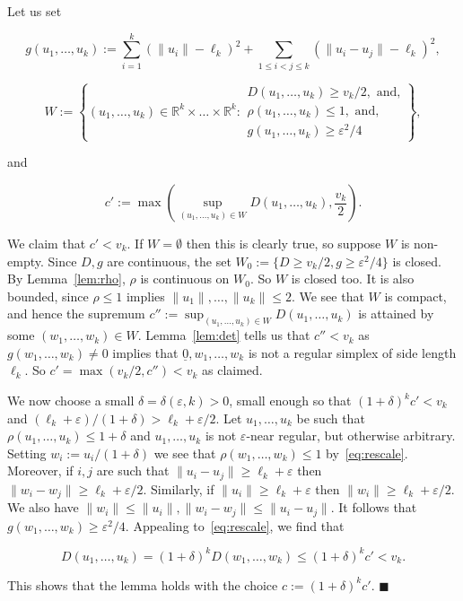 \documentclass[11pt]{article}%
\newenvironment{proof}{\vspace{1ex}\noindent{\bf Proof.}}{\hspace*{\fill}$\blacksquare$\vspace{1ex}}
\newcommand{\eR}[0]{\ensuremath{ \mathbb R}}
\newcommand{\norm}[1]{\ensuremath{\|#1\|}}
\newcommand{\eps}{\varepsilon}
\newcommand{\orig}{\underline{0}}
\begin{document}
\begin{proof}
Let us set

$$ \displaystyle g(u_1,\dots,u_k) := \sum_{i=1}^k \left( \norm{u_i}-\ell_k\right)^2 + \sum_{1\leq i<j \leq k}
 \left( \norm{u_i-u_j}-\ell_k\right)^2, $$
 
$$ W := \left\{ (u_1,\dots,u_k) \in \eR^k\times\dots\times\eR^k : 
\begin{array}{l} D(u_1,\dots,u_k) \geq v_k/2, \text{ and,} \\
\rho(u_1,\dots,u_k) \leq 1, \text{ and,} \\
g(u_1,\dots,u_k) \geq \eps^2/4
\end{array} \right\}, $$


\noindent 
and 

$$ c' := \max\left( \sup_{(u_1,\dots,u_k) \in W} D(u_1,\dots,u_k), \frac{v_k}{2} \right). $$

\noindent
We claim that $c' < v_k$. If $W = \emptyset$ then this is clearly true, so suppose $W$ is non-empty.
Since $D, g$ are continuous, the set $W_0 := \{ D \geq v_k/2, g \geq \eps^2/4 \}$ is closed.
By Lemma~\ref{lem:rho}, $\rho$ is continuous on $W_0$. So $W$ is closed too.
It is also bounded, since $\rho\leq 1$ implies $\norm{u_1},\dots,\norm{u_k} \leq 2$.
We see that $W$ is compact, and hence the supremum $c'' := \sup_{(u_1,\dots,u_k) \in W} D(u_1,\dots,u_k)$ is 
attained by some $(w_1,\dots,w_k) \in W$. Lemma~\ref{lem:det} tells us that 
$c'' < v_k$ as $g(w_1,\dots,w_k) \neq 0$ implies that $\orig,w_1,\dots,w_k$ is not a regular simplex
of side length $\ell_k$.
So $c' = \max( v_k/2, c'' ) < v_k$ as claimed.

We now choose a small $\delta=\delta(\eps,k) > 0$, small enough so that $(1+\delta)^k c' < v_k$ and 
$(\ell_k+\eps)/(1+\delta) > \ell_k + \eps/2$.
Let $u_1,\dots,u_k$ be such that $\rho(u_1,\dots,u_k) \leq 1+\delta$ and 
$u_1,\dots,u_k$ is not $\eps$-near regular, but otherwise arbitrary.
Setting $w_i := u_i/(1+\delta)$ we see that $\rho(w_1,\dots,w_k) \leq 1$ by~\eqref{eq:rescale}.
Moreover, if $i,j$ are such that $\norm{u_i-u_j} \geq \ell_k+\eps$  then $\norm{w_i-w_j} \geq \ell_k+\eps/2$.
Similarly, if $\norm{u_i} \geq \ell_k+\eps$  then $\norm{w_i} \geq \ell_k+\eps/2$.
We also have $\norm{w_i} \leq \norm{u_i}, \norm{w_i-w_j} \leq \norm{u_i-u_j}$. 
It follows that $g(w_1,\dots,w_k) \geq \eps^2/4$.
Appealing to~\eqref{eq:rescale}, we find that 

$$ D(u_1,\dots,u_k) = (1+\delta)^k D(w_1,\dots,w_k) \leq (1+\delta)^k c' < v_k. $$

\noindent
This shows that the lemma holds with the choice $c := (1+\delta)^k c'$.
\end{proof}
\end{document}
